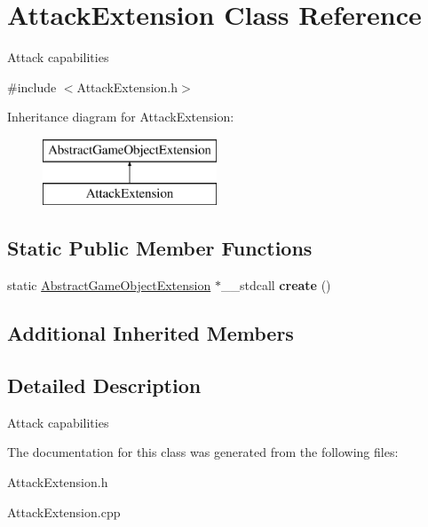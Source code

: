\hypertarget{class_attack_extension}{}\section{Attack\+Extension Class Reference}
\label{class_attack_extension}


Attack capabilities  




{\ttfamily \#include $<$Attack\+Extension.\+h$>$}

Inheritance diagram for Attack\+Extension\+:\begin{figure}[H]
\begin{center}
\leavevmode
\includegraphics[height=2.000000cm]{class_attack_extension}
\end{center}
\end{figure}
\subsection*{Static Public Member Functions}
\begin{DoxyCompactItemize}
\item 
\mbox{\label{class_attack_extension_ae1d31cc1bfefd2efe92475978b1a071c}} 
static \mbox{\hyperlink{class_abstract_game_object_extension}{Abstract\+Game\+Object\+Extension}} $\ast$\+\_\+\+\_\+stdcall {\bfseries create} ()
\end{DoxyCompactItemize}
\subsection*{Additional Inherited Members}


\subsection{Detailed Description}
Attack capabilities 



The documentation for this class was generated from the following files\+:\begin{DoxyCompactItemize}
\item 
Attack\+Extension.\+h\item 
Attack\+Extension.\+cpp\end{DoxyCompactItemize}
